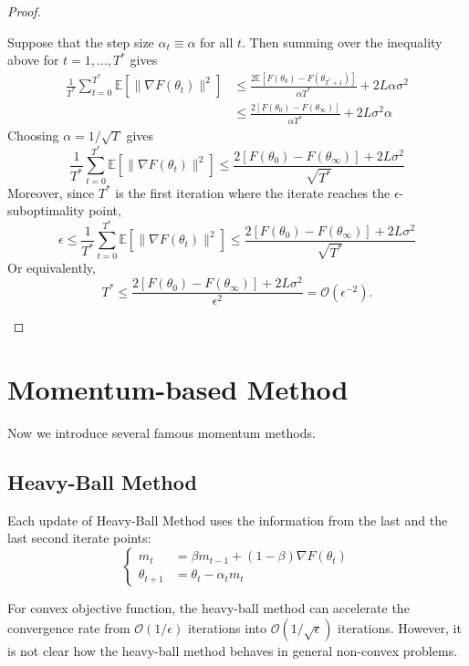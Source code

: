 \begin{proof}
\begin{enumerate}
Suppose that the step size $\alpha_t\equiv\alpha$ for all $t$. Then summing over the inequality above for $t=1,\dots,T^*$ gives
\begin{align*}
\frac{1}{T^*}\sum_{t=0}^{T^*}\mathbb{E}[\|\nabla F(\theta_t)\|^2]&\le \frac{2\mathbb{E}[F(\theta_0) - F(\theta_{T^*+1})]}{\alpha T^*}+2L\alpha\sigma^2\\
&\le \frac{2[F(\theta_0) - F(\theta_{\infty})]}{\alpha T^*}+2L\sigma^2\alpha 
\end{align*}
Choosing $\alpha=1/\sqrt{T}$ gives
\[
\frac{1}{T^*}\sum_{t=0}^{T^*}\mathbb{E}[\|\nabla F(\theta_t)\|^2]
\le \frac{2[F(\theta_0) - F(\theta_{\infty})]+2L\sigma^2}{\sqrt{T^*}}
\]
Moreover, since $T^*$ is the first iteration where the iterate reaches the $\epsilon$-suboptimality point,
\[
\epsilon\le \frac{1}{T^*}\sum_{t=0}^{T^*}\mathbb{E}[\|\nabla F(\theta_t)\|^2]\le \frac{2[F(\theta_0) - F(\theta_{\infty})]+2L\sigma^2}{\sqrt{T^*}}
\]
Or equivalently,
\[
T^*\le \frac{2[F(\theta_0) - F(\theta_{\infty})]+2L\sigma^2}{\epsilon^2}=\mathcal{O}(\epsilon^{-2}).
\]
\end{enumerate}
\end{proof}


\section{Momentum-based Method}
Now we introduce several famous momentum methods. 
\subsection{Heavy-Ball Method}
Each update of Heavy-Ball Method uses the information from the last and the last second iterate points:
\[
\left\{
\begin{aligned}
m_t &=\beta m _{t-1} + (1-\beta)\nabla F(\theta_t)\\
\theta_{t+1}&=\theta_t - \alpha_tm_t
\end{aligned}
\right.
\]
\begin{remark}
For convex objective function, the heavy-ball method can accelerate the convergence rate from $\mathcal{O}(1/\epsilon)$ iterations into $\mathcal{O}(1/\sqrt{\epsilon})$ iterations.
However, it is not clear how the heavy-ball method behaves in general non-convex problems.
\end{remark}
